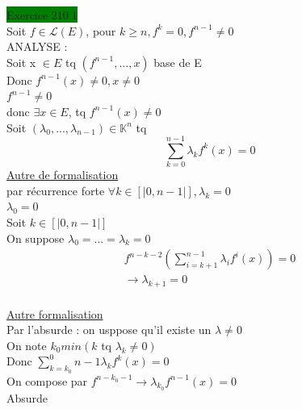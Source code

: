 \documentclass{article}
\begin{document}
 \Large
\noindent
\colorbox{green}{Exercice 210.1}\\

\noindent
Soit \(f \in \mathcal{L}(E)\), pour \(k \geq n, f^k = 0, f^{n-1} \neq 0\)\\
ANALYSE : \\
Soit x \(\in E\) tq \((f^{n-1},...,x)\) base de E\\
Donc \(f^{n-1}(x) \neq 0, x \neq 0\)
\\
\(f^{n-1} \neq 0 \)\\
donc \(\exists x \in E\), tq \(f^{n-1}(x) \neq 0\)\\
Soit \((\lambda_0,...,\lambda_{n-1}) \in \mathbb{K}^n\) tq \begin{equation*}
    \sum_{k=0}^{n-1}\lambda_k f^k(x) = 0
\end{equation*}
\underline{Autre de formalisation}\\
par récurrence forte \(\forall k \in [|0,n-1|], \lambda_k = 0\)\\
\(\lambda_0 = 0\)\\
Soit \(k\in [|0,n-1|]\)\\
On suppose \(\lambda_0 = ... = \lambda_k = 0\)\begin{eqnarray*}
    f^{n-k-2}(\sum_{i=k+1}^{n-1} \lambda_i f^i(x)) = 0\\
    \to \lambda_{k+1} = 0
\end{eqnarray*}\\
\underline{Autre formalisation}\\
Par l'absurde : on usppose qu'il existe un \(\lambda \neq 0\)\\
On note \(k_0 min(k \text{ tq } \lambda_k \neq 0)\)\\
Donc \(\sum_{k=k_0}^ 0{n-1}\lambda_k f^k(x) =0\)\\
On compose par \(f^{n-k_0-1} \rightarrow \lambda_{k_0}f^{n-1}(x) = 0\)\\
Absurde\\
\end{document}
